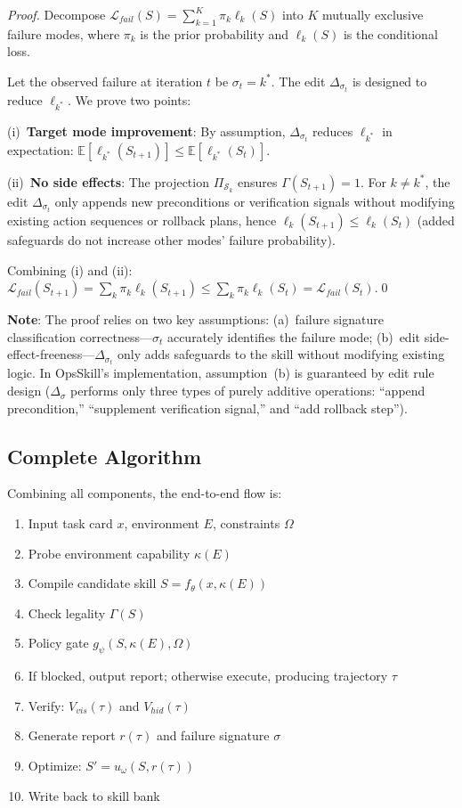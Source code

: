 \documentclass[conference,10pt]{IEEEtran}
\begin{document}
\begin{proof}
Decompose $\mathcal{L}_{fail}(S)=\sum_{k=1}^{K} \pi_k \ell_k(S)$ into $K$ mutually exclusive failure modes, where $\pi_k$ is the prior probability and $\ell_k(S)$ is the conditional loss.

Let the observed failure at iteration $t$ be $\sigma_t = k^*$.
The edit $\Delta_{\sigma_t}$ is designed to reduce $\ell_{k^*}$.
We prove two points:

(i)~\textbf{Target mode improvement}: By assumption, $\Delta_{\sigma_t}$ reduces $\ell_{k^*}$ in expectation: $\mathbb{E}[\ell_{k^*}(S_{t+1})] \le \mathbb{E}[\ell_{k^*}(S_t)]$.

(ii)~\textbf{No side effects}: The projection $\Pi_{\mathcal{S}_k}$ ensures $\Gamma(S_{t+1})=1$.
For $k \ne k^*$, the edit $\Delta_{\sigma_t}$ only appends new preconditions or verification signals without modifying existing action sequences or rollback plans, hence $\ell_k(S_{t+1}) \le \ell_k(S_t)$ (added safeguards do not increase other modes' failure probability).

Combining (i) and (ii): $\mathcal{L}_{fail}(S_{t+1}) = \sum_k \pi_k \ell_k(S_{t+1}) \le \sum_k \pi_k \ell_k(S_t) = \mathcal{L}_{fail}(S_t)$.\qed
\end{proof}

\noindent \textbf{Note}: The proof relies on two key assumptions: (a)~failure signature classification correctness---$\sigma_t$ accurately identifies the failure mode; (b)~edit side-effect-freeness---$\Delta_{\sigma_t}$ only adds safeguards to the skill without modifying existing logic.
In OpsSkill's implementation, assumption~(b) is guaranteed by edit rule design ($\Delta_\sigma$ performs only three types of purely additive operations: ``append precondition,'' ``supplement verification signal,'' and ``add rollback step'').

\subsection{Complete Algorithm}

Combining all components, the end-to-end flow is:
\begin{enumerate}
  \item Input task card $x$, environment $E$, constraints $\Omega$
  \item Probe environment capability $\kappa(E)$
  \item Compile candidate skill $S = f_\theta(x, \kappa(E))$
  \item Check legality $\Gamma(S)$
  \item Policy gate $g_\psi(S, \kappa(E), \Omega)$
  \item If blocked, output report; otherwise execute, producing trajectory $\tau$
  \item Verify: $V_{vis}(\tau)$ and $V_{hid}(\tau)$
  \item Generate report $r(\tau)$ and failure signature $\sigma$
  \item Optimize: $S' = u_\omega(S, r(\tau))$
  \item Write back to skill bank
\end{enumerate}
\end{document}
